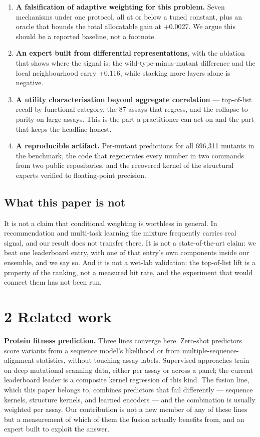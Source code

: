 \documentclass[sigconf,review,nonacm]{acmart}
\begin{document}
\begin{enumerate}
\def\labelenumi{\arabic{enumi}.}
\item
  \textbf{A falsification of adaptive weighting for this problem.} Seven mechanisms under one protocol, all
  at or below a tuned constant, plus an oracle that bounds the total allocatable gain at +0.0027. We
  argue this should be a reported baseline, not a footnote.
\item
  \textbf{An expert built from differential representations}, with the ablation that shows where the signal
  is: the wild-type-minus-mutant difference and the local neighbourhood carry +0.116, while stacking
  more layers alone is negative.
\item
  \textbf{A utility characterisation beyond aggregate correlation} --- top-of-list recall by functional
  category, the 87 assays that regress, and the collapse to parity on large assays. This is the part a
  practitioner can act on and the part that keeps the headline honest.
\item
  \textbf{A reproducible artifact.} Per-mutant predictions for all 696,311 mutants in the benchmark, the
  code that regenerates every number in two commands from two public repositories, and the recovered
  kernel of the structural experts verified to floating-point precision.
\end{enumerate}

\hypertarget{what-this-paper-is-not}{%
\subsection{What this paper is not}\label{what-this-paper-is-not}}

It is not a claim that conditional weighting is worthless in general. In recommendation and multi-task
learning the mixture frequently carries real signal, and our result does not transfer there. It is not a
state-of-the-art claim: we beat one leaderboard entry, with one of that entry's own components inside our
ensemble, and we say so. And it is not a wet-lab validation: the top-of-list lift is a property of the
ranking, not a measured hit rate, and the experiment that would connect them has not been run.

\hypertarget{related-work}{%
\section{2 Related work}\label{related-work}}

\textbf{Protein fitness prediction.} Three lines converge here. Zero-shot predictors score variants from a
sequence model's likelihood or from multiple-sequence-alignment statistics, without touching assay
labels. Supervised approaches train on deep mutational scanning data, either per assay or across a
panel; the current leaderboard leader is a composite kernel regression of this kind. The fusion line,
which this paper belongs to, combines predictors that fail differently --- sequence kernels, structure
kernels, and learned encoders --- and the combination is usually weighted per assay. Our contribution is
not a new member of any of these lines but a measurement of which of them the fusion actually benefits
from, and an expert built to exploit the answer.
\end{document}
